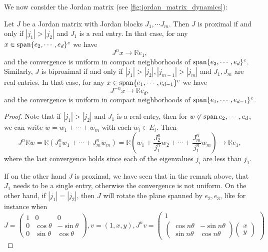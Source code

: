 \documentclass{report}
\begin{document}
We now consider the Jordan matrix (see \cref{fig:jordan_matrix_dynamics}):
\begin{proposition}
    Let $J$ be a Jordan matrix with Jordan blocks $J_1, \cdots J_m$.
    Then $J$ is proximal if and only if $|j_1| > |j_2|$ and $ J_1$ is a real entry.
    In that case, for any $x \in \operatorname{span} \{e_2, \cdots, e_d \}^c$ we have
    \[
    J^n x \to \mathbb R e_1,
    \]
    and the convergence is uniform in compact neighborhoods of $\operatorname{span} \{e_2, \cdots, e_d \}^c$.
    Similarly, $J$ is biproximal if and only if $|j_1| > |j_2|, |j_{m-1}| > |j_m|$ and $J_1, J_m$ are real entries.
    In that case, for any $x \in \operatorname{span} \{e_1, \cdots, e_{d-1} \}^c$ we have
    \[
    J^{-n} x \to \mathbb R e_d,
    \]
    and the convergence is uniform in compact neighborhoods of $\operatorname{span} \{e_1, \cdots, e_{d-1} \}^c$.
\end{proposition}
\begin{proof}
    Note that if $|j_1| > |j_2|$ and $J_1$ is a real entry, then for $w \not \in \operatorname{span}{ e_2, \cdots, e_d}$, we can write $w = w_1 + \cdots + w_m$ with each $w_i \in E_i$.
    Then 
    \[
    J^n \mathbb R w = \mathbb R (J_1^n w_1 + \cdots + J_m^n w_m) = 
    \mathbb R (w_1 + \frac{J_2^n}{j_1^n} w_2 + \cdots + \frac{J_m^n}{j_1^n} w_m) \to \mathbb R e_1,
    \]
    where the last convergence holds since each of the eigenvalues $j_i$ are less than $j_1$.

    If on the other hand $J$ is proximal, we have seen that in the remark above, that $J_1$ needs to be a single entry, otherwise the convergence is not uniform.
    On the other hand, if $|j_1| = |j_2|$, then $J$ will rotate the plane spanned by $e_2, e_3$, like for instance when
    \[
    J = \begin{pmatrix}
        1 & 0 & 0 \\
        0 & \cos \theta & - \sin \theta \\
        0 & \sin \theta & \cos \theta
    \end{pmatrix}, v = (1, x, y), J^n v = \begin{pmatrix}
        1\\
        \begin{pmatrix}
            \cos n \theta & - \sin n \theta \\
            \sin n \theta & \cos n \theta
        \end{pmatrix}
        \begin{pmatrix}
            x \\ y
        \end{pmatrix}
    \end{pmatrix}
    \]
\end{proof}
\end{document}
